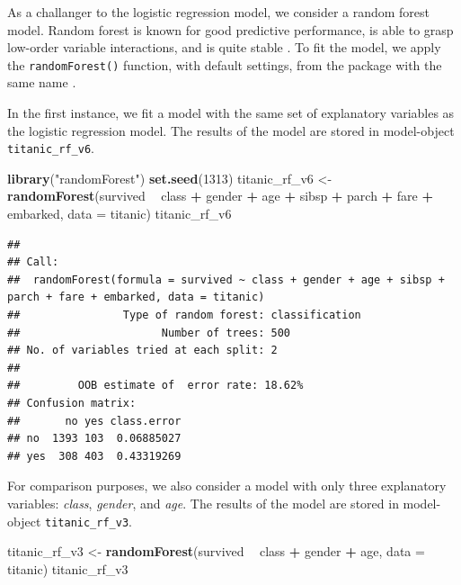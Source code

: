 \documentclass[12pt,]{krantz}
\newenvironment{Shaded}{\begin{snugshade}}{\end{snugshade}}
\newcommand{\DataTypeTok}[1]{\textcolor[rgb]{0.13,0.29,0.53}{#1}}
\newcommand{\DecValTok}[1]{\textcolor[rgb]{0.00,0.00,0.81}{#1}}
\newcommand{\KeywordTok}[1]{\textcolor[rgb]{0.13,0.29,0.53}{\textbf{#1}}}
\newcommand{\NormalTok}[1]{#1}
\newcommand{\OperatorTok}[1]{\textcolor[rgb]{0.81,0.36,0.00}{\textbf{#1}}}
\newcommand{\StringTok}[1]{\textcolor[rgb]{0.31,0.60,0.02}{#1}}
\begin{document}
As a challanger to the logistic regression model, we consider a random forest model. Random forest is known for good predictive performance, is able to grasp low-order variable interactions, and is quite stable \citep{randomForestBreiman}. To fit the model, we apply the \texttt{randomForest()} function, with default settings, from the package with the same name \citep{randomForestRNews}.

In the first instance, we fit a model with the same set of explanatory variables as the logistic regression model. The results of the model are stored in model-object \texttt{titanic\_rf\_v6}.

\begin{Shaded}
\begin{Highlighting}[]
\KeywordTok{library}\NormalTok{(}\StringTok{"randomForest"}\NormalTok{)}
\KeywordTok{set.seed}\NormalTok{(}\DecValTok{1313}\NormalTok{)}
\NormalTok{titanic_rf_v6 <-}\StringTok{ }\KeywordTok{randomForest}\NormalTok{(survived }\OperatorTok{~}\StringTok{ }\NormalTok{class }\OperatorTok{+}\StringTok{ }\NormalTok{gender }\OperatorTok{+}\StringTok{ }\NormalTok{age }\OperatorTok{+}\StringTok{ }\NormalTok{sibsp }\OperatorTok{+}\StringTok{ }\NormalTok{parch }\OperatorTok{+}\StringTok{ }\NormalTok{fare }\OperatorTok{+}\StringTok{ }\NormalTok{embarked, }
                           \DataTypeTok{data =}\NormalTok{ titanic)}
\NormalTok{titanic_rf_v6}
\end{Highlighting}
\end{Shaded}

\begin{verbatim}
## 
## Call:
##  randomForest(formula = survived ~ class + gender + age + sibsp +      parch + fare + embarked, data = titanic) 
##                Type of random forest: classification
##                      Number of trees: 500
## No. of variables tried at each split: 2
## 
##         OOB estimate of  error rate: 18.62%
## Confusion matrix:
##       no yes class.error
## no  1393 103  0.06885027
## yes  308 403  0.43319269
\end{verbatim}

For comparison purposes, we also consider a model with only three explanatory variables: \emph{class}, \emph{gender}, and \emph{age}. The results of the model are stored in model-object \texttt{titanic\_rf\_v3}.

\begin{Shaded}
\begin{Highlighting}[]
\NormalTok{titanic_rf_v3 <-}\StringTok{ }\KeywordTok{randomForest}\NormalTok{(survived }\OperatorTok{~}\StringTok{ }\NormalTok{class }\OperatorTok{+}\StringTok{ }\NormalTok{gender }\OperatorTok{+}\StringTok{ }\NormalTok{age, }\DataTypeTok{data =}\NormalTok{ titanic)}
\NormalTok{titanic_rf_v3}
\end{Highlighting}
\end{Shaded}
\end{document}
